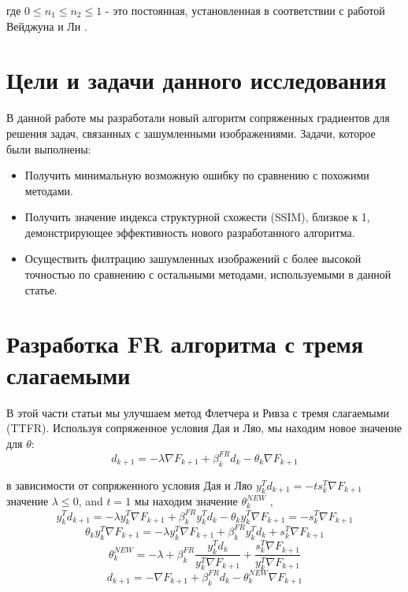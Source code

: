 где $0 \le n_{1} \le n_{2} \le 1 $ - это постоянная, установленная в
соответствии с работой Вейджуна и Ли \cite{art17}.

\section{Цели и задачи данного исследования}

В данной работе мы разработали новый алгоритм сопряженных градиентов для решения
задач, связанных с зашумленными изображениями. Задачи, которое были выполнены:

\begin{itemize}
    \item Получить минимальную возможную ошибку по сравнению с похожими методами.
    \item Получить значение индекса структурной схожести (SSIM), близкое к 1,
        демонстрирующее эффективность нового разработанного алгоритма.
    \item Осуществить филтрацию зашумленных изображений с более высокой
        точностью по сравнению с остальными методами, используемыми в данной
        статье.
\end{itemize}

\section{Разработка FR алгоритма с тремя слагаемыми}

В этой части статьи мы улучшаем метод Флетчера и Ривза с тремя слагаемыми (TTFR).
Используя сопряженное условия Дая и Ляо, мы находим новое значение для $\theta$:
\begin{equation*}
    d_{k+1}=-\lambda \nabla F_{k+1}+\beta_{k}^{F R}d_{k}-\theta_{k}\nabla F_{k+1}
\end{equation*}

в зависимости от сопряженного условия Дая и Ляо $ y_{k}^{T}d_{k+1}=-t s_{k}^{T}\nabla F_{k+1} $
значение $ \lambda \le 0 $, and $ t = 1 $ мы находим значение $ \theta_{k}^{NEW}$ \cite{art7},
\begin{equation*}
    y_{k}^{T}d_{k+1}=-\lambda y_{k}^{T}\nabla F_{k+1}+\beta_{k}^{F R}y_{k}^{T}d_{k}-\theta_{k}y_{k}^{T}\nabla F_{k+1}=-s_{k}^{T}\nabla F_{k+1}
\end{equation*}
\begin{equation*}
    \theta_{k}y_{k}^{T}\nabla F_{k+1}=-\lambda y_{k}^{T}\nabla F_{k+1}+\beta_{k}^{F R}y_{k}^{T}d_{k}+s_{k}^{T}\nabla F_{k+1}
\end{equation*}
\begin{equation}\label{eqn:eq7}
    \theta_{k}^{N E W}=-\lambda+\beta_{k}^{F R}\frac{y_{k}^{T}d_{k}}{y_{k}^{T}\nabla F_{k+1}}+\frac{s_{k}^{T}\nabla F_{k+1}}{y_{k}^{T}\nabla F_{k+1}}
\end{equation}
\begin{equation}\label{eqn:eq8}
    d_{k+1}=-\nabla F_{k+1}+\beta_{k}^{F R}d_{k}-\theta_{k}^{N E W} \nabla F_{k+1}
\end{equation}

